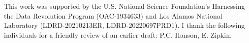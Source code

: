 \documentclass{article}
\begin{document}
This work was supported by the U.S. National Science Foundation’s Harnessing the Data Revolution Program (OAC-1934633) and Los Alamos National Laboratory (LDRD-20210213ER, LDRD-20220697PRD1). I thank the following individuals for a friendly review of an earlier draft: P.C. Hanson, E. Zipkin.








\end{document}
